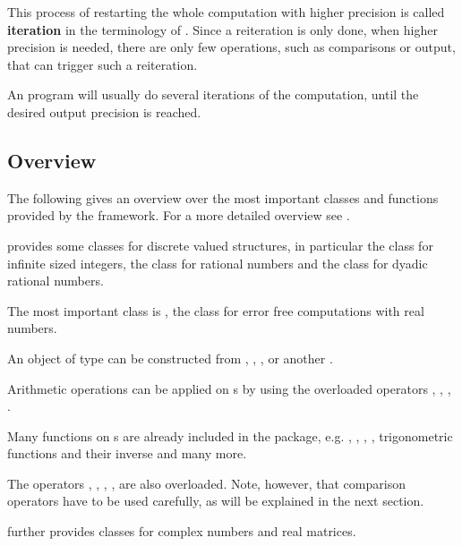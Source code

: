  		This process of restarting the whole computation with higher precision is called
    \textbf{iteration} in the terminology of \irram.
    Since a reiteration is only done, when higher precision is needed, there
    are only few operations, such as comparisons or output, that can trigger such a reiteration.

    An \irram program will usually do several iterations of the computation,
    until the desired output precision is reached.
    
	\subsection{Overview}
	  The following gives an overview over the most important classes and
    functions provided by the \irram framework. For a more detailed overview
    see \cite{irram}.
		
    \irram provides some classes for discrete valued structures, in particular
    the class  for infinite sized integers, the class
     for rational numbers and the class  for dyadic
    rational numbers. 

    The most important class is \real, the class for error free computations
    with real numbers. 

		An object of type \real can be constructed from , , ,  
		or another \real. 

		Arithmetic operations can be applied on \real s by using the overloaded operators \code{+}, \code{-}, \code{*},
		\code{/}.

		Many functions on \real s are already included in the \irram package, e.g. 
		, , , ,
		trigonometric functions and their inverse and many more.

		The operators \code{<}, \code{<=}, \code{==}, \code{>=}, \code{>} are also
    overloaded.
    Note, however, that comparison operators have to be used carefully, as will be explained in the
    next section.
    
   \irram further provides classes for complex numbers and real matrices.

